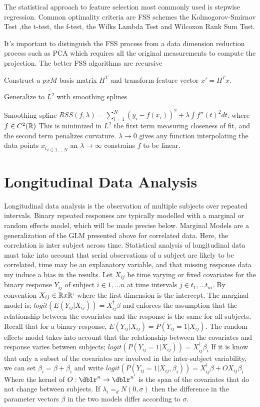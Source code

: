 The statistical approach to feature selection most commonly used is stepwise regression.  Common optimality criteria are FSS schemes the Kolmogorov-Smirnov Test ,the t-test, the f-test, the Wilks Lambda Test and Wilcoxon Rank Sum Test.

It's important to distinguish the FSS process from a data dimension reduction process such as PCA which requires all the original measurements to compute the projection. The better FSS algorithms are recursive

Construct a $p x M$ basis matrix $H^{T}$ and transform feature vector $x' = H^{T} x$.


Generalize to $L^{2}$ with smoothing splines

Smoothing spline $RSS(f,\lambda)= \sum\limits_{i=1}^{N} (y_{i} -f(x_{i}) )^{2} + \lambda \int f''(t)^{2} dt$. where $f \in C^{2}(\mathbb{R} )$ This is minimized in $L^{2}$ the first term measuring closeness of fit, and the second term penalizes curvature. $\lambda \rightarrow 0$ gives any function interpolating the data points ${x_i}_{i  \in {1, ... N} } $ an $\lambda \rightarrow \infty$ constrains $f$ to be linear.

\section{Longitudinal Data Analysis} Longitudinal data analysis is the observation of multiple subjects over repeated intervals. Binary repeated responses are typically modelled with a marginal or random effects model, which will be made precise below. Marginal Models are a generalization of the GLM presented above for correlated data.  Here, the correlation is inter subject across time.  Statistical analysis of longitudinal data must take into account that serial observations of a subject are likely to be correlated, time may be an explanatory variable, and that missing response data my induce a bias in the results.  Let ${X_{ij}}$ be time varying or fixed covariates for the binary response ${Y_{ij}}$ of subject $i \in {1,...n}$ at time intervals $j \in {t_1,...t_m}$. By convention $X_{ij} \in \mathbb{R} x \mathbb{R^p}$ where the first dimension is the intercept. The marginal model is; $logit (E(Y_{ij} | X_{ij}) ) = X_{ij}^{\dagger} \beta$ and enforces the assumption that the relationship between the covariates and the response is the same for all subjects. Recall that for a binary response, $E(Y_{ij} | X_{ij}) = P(Y_{ij}=1 | X_{ij})$.  The random effects model takes into account that the relationship between the covariates and response varies between subjects; $logit (P(Y_{ij}=1 | X_{ij}) ) = X_{ij}^{\dagger} \beta_i$ If it is know that only a subset of the covariates are involved in the inter-subject variability, we can set $\beta_i= \beta + \beta_i$ and write $logit (P(Y_{ij}=1 | X_{ij}, \beta_i) ) = X_{ij}^{\dagger} \beta + O X_{ij} \beta_i$ Where the kernel of $O : \dblr^n \rightarrow \dblr^{n'}$ is the span of the covariates that do not change between subjects.  If $\lambda_i =_d N(0,\sigma)$ then the difference in the parameter vectors $\beta$ in the two models differ according to $\sigma$.

